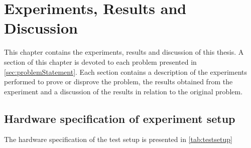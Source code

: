 
\chapter{Experiments, Results and Discussion}
\label{cha:experiments}
This chapter contains the experiments, results and discussion of this thesis. A section of this chapter is devoted to each problem presented in \cref{sec:problemStatement}. Each section contains a description of the experiments performed to prove or disprove the problem, the results obtained from the experiment and a discussion of the results in relation to the original problem.




\section{Hardware specification of experiment setup}
The hardware specification of the test setup is presented in \cref{tab:testsetup}


